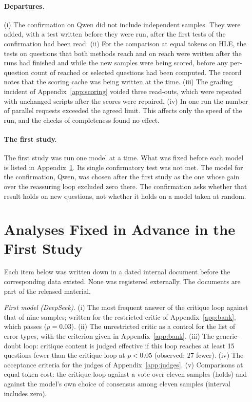 \documentclass[11pt]{article}
\newcommand{\ds}{DeepSeek}
\newcommand{\qw}{Qwen}
\begin{document}
\paragraph{Departures.}
(i) The confirmation on \qw{} did not include independent samples. They were added, with a test written before they were run, after the first tests of the confirmation had been read.
(ii) For the comparison at equal tokens on HLE, the tests on questions that both methods reach and on reach were written after the runs had finished and while the new samples were being scored, before any per-question count of reached or selected questions had been computed. The record notes that the scoring cache was being written at the time.
(iii) The grading incident of Appendix~\ref{app:scoring} voided three read-outs, which were repeated with unchanged scripts after the scores were repaired.
(iv) In one run the number of parallel requests exceeded the agreed limit. This affects only the speed of the run, and the checks of completeness found no effect.

\paragraph{The first study.}
The first study was run one model at a time. What was fixed before each model is listed in Appendix~\ref{app:prereg}.
Its single confirmatory test was not met.
The model for the confirmation, \qw, was chosen after the first study as the one whose gain over the reassuring loop excluded zero there. The confirmation asks whether that result holds on new questions, not whether it holds on a model taken at random.

\section{Analyses Fixed in Advance in the First Study}
\label{app:prereg}

Each item below was written down in a dated internal document before the corresponding data existed. None was registered externally.
The documents are part of the released material.

\emph{First model (\ds).}
(i) The most frequent answer of the critique loop against that of nine samples; written for the restricted critic of Appendix~\ref{app:bank}, which passes ($p=0.03$).
(ii) The unrestricted critic as a control for the list of error types, with the criterion given in Appendix~\ref{app:bank}.
(iii) The generic-doubt loop: critique content is judged effective if this loop reaches at least 15 questions fewer than the critique loop at $p<0.05$ (observed: 27 fewer).
(iv) The acceptance criteria for the judges of Appendix~\ref{app:judges}.
(v) Comparisons at equal token cost: the critique loop against a vote over eleven samples (holds) and against the model's own choice of consensus among eleven samples (interval includes zero).
\end{document}
